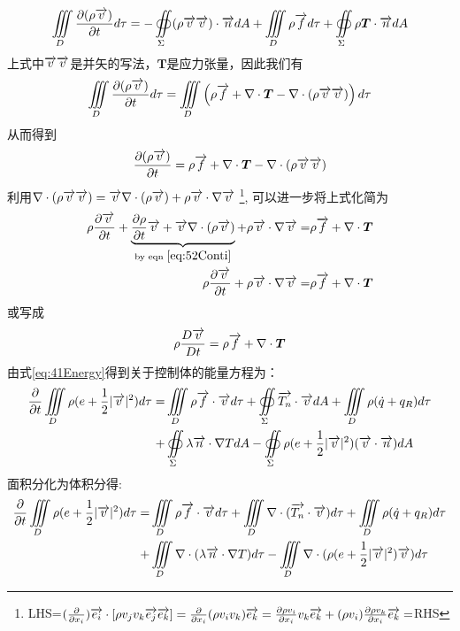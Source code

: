 \begin{equation}
\iiint\limits_{D}\frac{\partial (\rho\overrightarrow{v})}{\partial t} d\tau =- \oiint\limits_{\Sigma} (\rho\overrightarrow{v}\overrightarrow{v})\cdot \overrightarrow{n} dA +
\iiint\limits_{D} \rho \overrightarrow{f} d\tau + 
\oiint\limits_{\Sigma} \rho \bm{T}\cdot\overrightarrow{n} dA
\end{equation}
上式中$\overrightarrow{v}\overrightarrow{v}$是并矢的写法，$\bm{T}$是应力张量，因此我们有
\begin{equation}
\iiint\limits_{D} \frac{\partial (\rho\overrightarrow{v})}{\partial t}d\tau=
\iiint\limits_{D} \left(\rho\overrightarrow{f}+\nabla\cdot\bm{T}-\nabla\cdot(\rho\overrightarrow{v}\overrightarrow{v})\right)d\tau
\end{equation}
从而得到
\begin{equation}
 \frac{\partial (\rho\overrightarrow{v})}{\partial t}=\rho\overrightarrow{f}+\nabla\cdot\bm{T}-\nabla\cdot(\rho\overrightarrow{v}\overrightarrow{v})
 \end{equation}
利用$\nabla\cdot(\rho\overrightarrow{v}\overrightarrow{v})=\overrightarrow{v}\nabla\cdot(\rho\overrightarrow{v})+\rho\overrightarrow{v}\cdot\nabla\overrightarrow{v}$
\footnote{
LHS=$(\frac{\partial}{\partial x_i})\overrightarrow{e_i}\cdot[\rho v_jv_k\overrightarrow{e_j}\overrightarrow{e_k}]
=\frac{\partial}{\partial x_i}(\rho v_iv_k)\overrightarrow{e_k}
=\frac{\partial \rho v_i}{\partial x_i}v_k\overrightarrow{e_k}+(\rho v_i)\frac{\partial \rho v_k}{\partial x_i}\overrightarrow{e_k}
=$RHS
},
可以进一步将上式化简为
\begin{align}\notag
 \rho\frac{\partial \overrightarrow{v}}{\partial t}+\underbrace{\frac{\partial \rho}{\partial t}\overrightarrow{v}+\overrightarrow{v}\nabla\cdot(\rho\overrightarrow{v})}_{\text{by eqn }\eqref{eq:52Conti}}+\rho\overrightarrow{v}\cdot\nabla\overrightarrow{v}=&\rho\overrightarrow{f}+\nabla\cdot\bm{T}\\
 \rho\frac{\partial \overrightarrow{v}}{\partial t}+\rho\overrightarrow{v}\cdot\nabla\overrightarrow{v}=&\rho\overrightarrow{f}+\nabla\cdot\bm{T}\label{eq:52Momen}
 \end{align}
或写成
\begin{equation}
\rho\frac{D \overrightarrow{v}}{D t}=\rho \overrightarrow{f} + \nabla \cdot \bm{T}
\end{equation}
由式\eqref{eq:41Energy}得到关于控制体的能量方程为：
\begin{align}\notag
\frac{\partial}{\partial t}\iiint\limits_{D} \rho(e+\frac{1}{2}|\overrightarrow{v}|^2) d\tau =& \iiint\limits_{D} \rho \overrightarrow{f}\cdot\overrightarrow{v} d\tau + 
\oiint\limits_{\Sigma}  \overrightarrow{T_n}\cdot\overrightarrow{v} dA + \iiint\limits_{D}\rho (\dot{q}+q_R)d\tau \\
+&\oiint\limits_{\Sigma} \lambda \overrightarrow{n}\cdot \nabla T dA-\oiint\limits_{\Sigma}\rho(e+\frac{1}{2}|\overrightarrow{v}|^2)(\overrightarrow{v}\cdot\overrightarrow{n})dA
\end{align}
面积分化为体积分得:
\begin{align}\notag
\frac{\partial}{\partial t}\iiint\limits_{D} \rho(e+\frac{1}{2}|\overrightarrow{v}|^2) d\tau =& 
\iiint\limits_{D} \rho \overrightarrow{f}\cdot\overrightarrow{v} d\tau + 
\iiint\limits_{D}  \nabla\cdot(\overrightarrow{T_n}\cdot\overrightarrow{v}) d\tau + 
\iiint\limits_{D}\rho (\dot{q}+q_R)d\tau \\
+&\iiint\limits_{D} \nabla\cdot(\lambda \overrightarrow{n}\cdot \nabla T) d\tau-
\iiint\limits_{D}\nabla\cdot(\rho(e+\frac{1}{2}|\overrightarrow{v}|^2)\overrightarrow{v})d\tau
\end{align}
